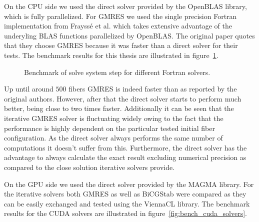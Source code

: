 \documentclass[a4paper,11pt]{kth-mag}
\begin{document}
On the CPU side we used the direct solver provided by the OpenBLAS library, which is fully parallelized. For GMRES we used the single precision Fortran implementation from Frayssé et al. which takes extensive advantage of the underyling BLAS functions parallelized by OpenBLAS. The original paper quotes that they choose GMRES because it was faster than a direct solver for their tests. The benchmark results for this thesis are illustrated in figure~\ref{fig:bench_openmp_solvers}.

\begin{figure}
  \centering
  \caption{Benchmark of solve system step for different Fortran solvers.}
  \label{fig:bench_openmp_solvers}
\end{figure}

Up until around $500$ fibers GMRES is indeed faster than as reported by the original authors. However, after that the direct solver starts to perform much better, being close to two times faster. Additionally it can be seen that the iterative GMRES solver is fluctuating widely owing to the fact that the performance is highly dependent on the particular tested initial fiber configuration. As the direct solver always performs the same number of computations it doesn't suffer from this. Furthermore, the direct solver has the advantage to always calculate the exact result excluding numerical precision as compared to the close solution iterative solvers provide.

On the GPU side we used the direct solver provided by the MAGMA library. For the iterative solvers both GMRES as well as BiCGStab were compared as they can be easily exchanged and tested using the ViennaCL library. The benchmark results for the CUDA solvers are illustrated in figure~\ref{fig:bench_cuda_solvers}.
\end{document}
